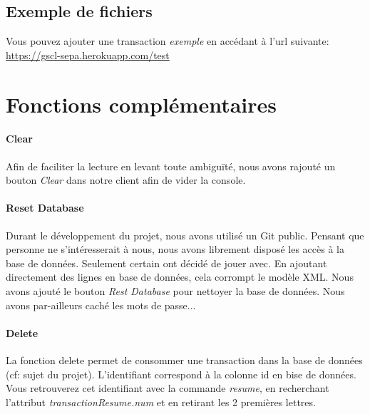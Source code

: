 \documentclass{article}
\begin{document}
    \subsection{Exemple de fichiers}
      Vous pouvez ajouter une transaction \emph{exemple} en accédant à l'url suivante: \\
      \url{https://gscl-sepa.herokuapp.com/test}
      
  \newpage
  \section{Fonctions complémentaires}
    \paragraph{Clear}
      Afin de faciliter la lecture en levant toute ambiguïté, nous avons rajouté un bouton \emph{Clear} dans
      notre client afin de vider la console.
    \paragraph{Reset Database}
      Durant le développement du projet, nous avons utilisé un Git public. Pensant que personne ne s'intéresserait à nous,
      nous avons librement disposé les accès à la base de données. Seulement certain ont décidé de jouer avec. 
      En ajoutant directement des lignes en base de données, cela corrompt le modèle XML. Nous avons ajouté le bouton
      \emph{Rest Database} pour nettoyer la base de données. Nous avons par-ailleurs caché les mots de passe...
    \paragraph{Delete}
      La fonction delete permet de consommer une transaction dans la base de données (cf: sujet du projet).
      L'identifiant correspond à la colonne id en bise de données. Vous retrouverez cet identifiant avec la commande \emph{resume},
      en recherchant l'attribut \emph{transactionResume.num} et en retirant les 2 premières lettres.
\end{document}
